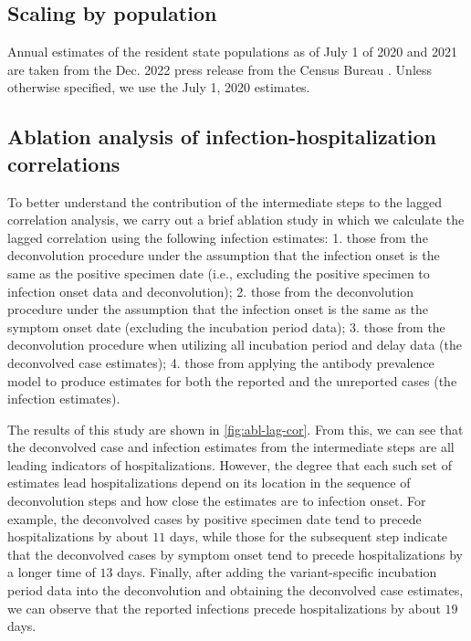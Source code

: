 \subsection{Scaling by population}

Annual estimates of the resident state
populations as of July 1 of 2020 and 2021 are taken from the Dec.
2022 press release from the \US Census Bureau \citep{uscensus2022annual}.
Unless otherwise specified, we use the July 1, 2020 estimates.


\subsection{Ablation analysis of infection-hospitalization correlations}

To better understand the contribution of the intermediate steps to the lagged
correlation analysis, we carry out a brief ablation study in which we calculate
the lagged correlation using the following infection estimates: 1. those from
the deconvolution procedure under the assumption that the infection onset is the
same as the positive specimen date (i.e., excluding the positive specimen to
infection onset data and deconvolution); 2. those from the deconvolution
procedure under the assumption that the infection onset is the same as the
symptom onset date (excluding the incubation period data); 3. those from the
deconvolution procedure when utilizing all incubation period and delay data (the
deconvolved case estimates); 4. those from applying the antibody prevalence
model to produce estimates for both the reported and the unreported cases (the
infection estimates).

The results of this study are shown in \autoref{fig:abl-lag-cor}. From
this, we can see that the deconvolved case and infection estimates from the
intermediate steps are all leading indicators of hospitalizations. However, the
degree that each such set of estimates lead hospitalizations depend on its
location in the sequence of deconvolution steps and how close the estimates are to infection
onset. For example, the deconvolved cases by positive specimen date tend to
precede hospitalizations by about $11$ days, while those for the subsequent step
indicate that the deconvolved cases by symptom onset tend to precede
hospitalizations by a longer time of $13$ days. Finally, after adding the
variant-specific incubation period data into the deconvolution and obtaining the
deconvolved case estimates, we can observe that the reported infections precede
hospitalizations by about $19$ days. 

